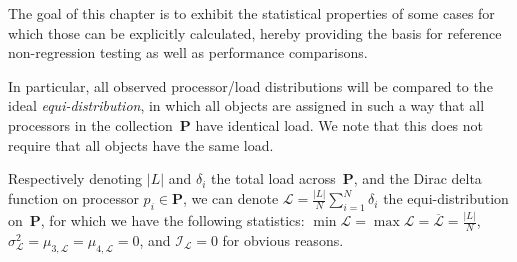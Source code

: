 The goal of this chapter is to exhibit the statistical properties of
some cases for which those can be explicitly calculated, hereby
providing the basis for reference non-regression testing as well as
performance comparisons.

In particular, all observed processor/load distributions will be
compared to the ideal \emph{equi-distribution}, in which all
objects are assigned in such a way that all processors in the
collection~$\mathbf{P}$ have identical load.
We note that this does not require that all objects have the same
load.

Respectively denoting $\vert{L}\vert$ and $\delta_i$ the total load
across~$\mathbf{P}$, and the Dirac delta function on processor
$p_i\in\mathbf{P}$, we can denote
$\mathcal{L}=\frac{\vert{L}\vert}{N}\sum_{i=1}^N\delta_i$ the
equi-distribution on~$\mathbf{P}$, for which we have 
the following statistics:
$\min{\mathcal{L}} = \max{\mathcal{L}}
= \overline{\mathcal{L}} = \frac{\vert{L}\vert{}}{N}$,
$\sigma_{\mathcal{L}}^2 = \mu_{3,\mathcal{L}} = \mu_{4,\mathcal{L}} = 0$,
and
$\mathcal{I}_{\mathcal{L}}= 0$
for obvious reasons.


